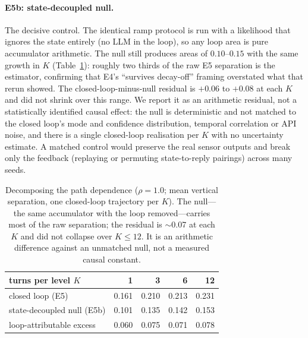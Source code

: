 \documentclass[11pt]{article}
\begin{document}
\paragraph{E5b: state-decoupled null.} The decisive control. The identical ramp
protocol is run with a likelihood that ignores the state entirely (no LLM in
the loop), so any loop area is pure accumulator arithmetic. The null still
produces areas of $0.10$--$0.15$ with the same growth in $K$
(Table~\ref{tab:memdecomp}): roughly two thirds of the raw E5 separation is
the estimator, confirming that E4's ``survives decay-off'' framing overstated
what that rerun showed. The closed-loop-minus-null residual is $+0.06$ to
$+0.08$ at each $K$ and did not shrink over this range. We report it as an
arithmetic residual, not a statistically identified causal effect: the null is
deterministic and not matched to the closed loop's mode and confidence
distribution, temporal correlation or API noise, and there is a single
closed-loop realisation per $K$ with no uncertainty estimate. A matched control
would preserve the real sensor outputs and break only the feedback
(replaying or permuting state-to-reply pairings) across many seeds.

\begin{table}[t]
\centering
\begin{tabular}{lrrrr}
\toprule
turns per level $K$ & 1 & 3 & 6 & 12 \\
\midrule
closed loop (E5)          & 0.161 & 0.210 & 0.213 & 0.231 \\
state-decoupled null (E5b) & 0.101 & 0.135 & 0.142 & 0.153 \\
\midrule
loop-attributable excess  & 0.060 & 0.075 & 0.071 & 0.078 \\
\bottomrule
\end{tabular}
\caption{Decomposing the path dependence ($\rho=1.0$; mean vertical
separation, one closed-loop trajectory per $K$). The null---the same accumulator
with the loop removed---carries most of the raw separation; the residual is
$\sim$0.07 at each $K$ and did not collapse over $K\le12$. It is an arithmetic
difference against an unmatched null, not a measured causal constant.}
\label{tab:memdecomp}
\end{table}
\end{document}
